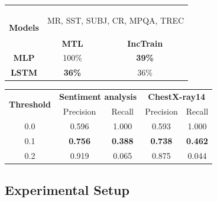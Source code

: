 \begin{table}
\begin{minipage}[t]{.40\textwidth}
	\centering
	\begin{tabular}{c c c}
		\toprule
		\multirow{2}{*}{{\bf Models}} & \multicolumn{2}{c}{\begin{minipage}{1.1in}\begin{center}
		MR, SST, SUBJ, CR, MPQA, TREC\end{center}\end{minipage}} \\
		\cmidrule(lr){2-3}
		& {\bf MTL} & {\bf IncTrain} \\
		\midrule
		{\bf MLP}  & 100\% & \textbf{39\%} \\
		{\bf LSTM} & \textbf{36\%} & 36\% \\
		\bottomrule
		\end{tabular}
	\vspace{0.1in}
	\label{tab:taskonomy}
	\vspace{-0.2in}
\end{minipage}%
\quad
\begin{minipage}[t]{.58\textwidth}
	\centering
  \begin{tabular}{c c c c c}
	\toprule
		\multirow{2}{*}{{\bf Threshold}}  & \multicolumn{2}{c}{{\bf Sentiment
		analysis}} & \multicolumn{2}{c}{{\bf ChestX-ray14}} \\
		& Precision &  Recall & Precision &  Recall \\
		\cmidrule(lr){1-1} \cmidrule(lr){2-3} \cmidrule(lr){4-5}
		0.0 & 0.596 & 1.000 & 0.593 & 1.000 \\
		0.1 & \textbf{0.756} & \textbf{0.388} & \textbf{0.738} & \textbf{0.462} \\
		0.2 & 0.919 & 0.065 & 0.875 & 0.044 \\
	\bottomrule
	\end{tabular}
	\vspace{0.1in}
	\label{tab:mtl_better_than_stl}
	\vspace{-0.2in}
\end{minipage}
\end{table}

\subsection{Experimental Setup}

